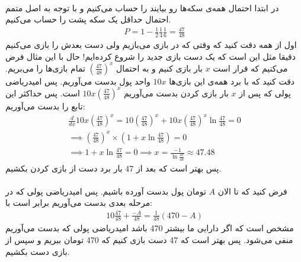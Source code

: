  \\
در ابتدا احتمال همه‌ی سکه‌ها رو بیایند را حساب می‌کنیم و با توجه به اصل متمم احتمال حداقل یک سکه پشت را حساب می‌کنیم.
\begin{gather*}
    P = 1 - \frac{1}{2} \frac{1}{4} \frac{1}{6} = \frac{47}{48}
\end{gather*}
اول از همه دقت کنید که وقتی که در بازی می‌بازیم ولی دست بعدش را بازی می‌کنیم دقیقا مثل این است که یک دست
بازی جدید را شروع کرده‌ایم! حال با این مثال فرض می‌کنیم که قرار است
$x$
بار بازی کنیم و به احتمال
$(\frac{47}{48})^x$
تمام بازی‌ها را می‌بریم. دقت کنید که با برد همه‌ی این بازی‌ها
$10x$
واحد پول بدست می‌آوریم. پس امیدریاضی پولی که پس از
$x$
بار بازی کردن بدست می‌آوریم
$10x(\frac{47}{48})^x$
است. پس حداکثر این تابع را بدست می‌آوریم:
\begin{gather*}
    \frac{d}{dx} 10x(\frac{47}{48})^x = 10 (\frac{47}{48})^x + 10x(\frac{47}{48})^x \ln \frac{47}{48} = 0\\
    \implies (\frac{47}{48})^x \times (1 + x \ln \frac{47}{48}) = 0\\
    \implies 1 + x \ln \frac{47}{48} = 0 \implies x = \frac{-1}{\ln \frac{47}{48}} \approx 47.48
\end{gather*}
پس بهتر است که بعد از 47 بار برد دست از بازی کردن بکشیم.\\
\\
فرض کنید که تا الان
$A$
تومان پول بدست آورده باشیم. پس امیدریاضی پولی که در مرحله بعدی بدست می‌آوریم برابر است با:
\begin{gather*}
    10 \frac{47}{48} + \frac{-A}{48} = \frac{1}{48} (470 - A)
\end{gather*}
مشخص است که اگر دارایی ما بیشتر
470
باشد امیدریاضی پولی که بدست می‌آوریم منفی می‌شود. پس بهتر است که 47 دست بازی کنیم که 470 تومان ببریم و
سپس از بازی دست بکشیم.


